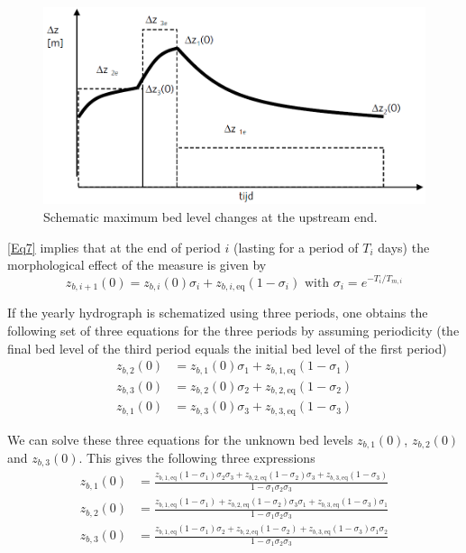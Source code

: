 \begin{figure}
\includegraphics[width=\columnwidth]{figures/Fig5.png}
\caption{Schematic maximum bed level changes at the upstream end.}
\label{Fig5}
\end{figure}

\autoref{Eq7} implies that at the end of period $i$ (lasting for a period of $T_i$ days) the morphological effect of the measure is given by
%
\begin{equation}
z_{b,i+1}(0) = z_{b,i} (0) \sigma_i + z_{b,i,\text{eq}} (1-\sigma_i) \text{ with } \sigma_i = e^{-T_i/T_{m,i}}
\label{Eq8a}
\end{equation}

If the yearly hydrograph is schematized using three periods, one obtains the following set of three equations for the three periods by assuming periodicity (the final bed level of the third period equals the initial bed level of the first period)
%
\begin{align}
z_{b,2}(0) &= z_{b,1}(0) \sigma_1 + z_{b,1,\text{eq}} (1-\sigma_1) \label{Eq8b} \\
z_{b,3}(0) &= z_{b,2}(0) \sigma_2 + z_{b,2,\text{eq}} (1-\sigma_2) \label{Eq8c} \\
z_{b,1}(0) &= z_{b,3}(0) \sigma_3 + z_{b,3,\text{eq}} (1-\sigma_3) \label{Eq8d}
\end{align}

We can solve these three equations for the unknown bed levels $z_{b,1}(0)$, $z_{b,2}(0)$ and $z_{b,3}(0)$.
This gives the following three expressions
%
\begin{align}
z_{b,1}(0) &= \frac{z_{b,1,\text{eq}} (1-\sigma_1) \sigma_2 \sigma_3 + z_{b,2,\text{eq}} (1-\sigma_2) \sigma_3 + z_{b,3,\text{eq}} (1-\sigma_3)}{1 - \sigma_1 \sigma_2 \sigma_3} \label{Eq8e} \\
z_{b,2}(0) &= \frac{z_{b,1,\text{eq}} (1-\sigma_1) + z_{b,2,\text{eq}} (1-\sigma_2) \sigma_3 \sigma_1 + z_{b,3,\text{eq}} (1-\sigma_3) \sigma_1}{1 - \sigma_1 \sigma_2 \sigma_3} \label{Eq8f} \\
z_{b,3}(0) &= \frac{z_{b,1,\text{eq}} (1-\sigma_1) \sigma_2 + z_{b,2,\text{eq}} (1-\sigma_2) + z_{b,3,\text{eq}} (1-\sigma_3) \sigma_1 \sigma_2}{1 - \sigma_1 \sigma_2 \sigma_3} \label{Eq8g}
\end{align}

